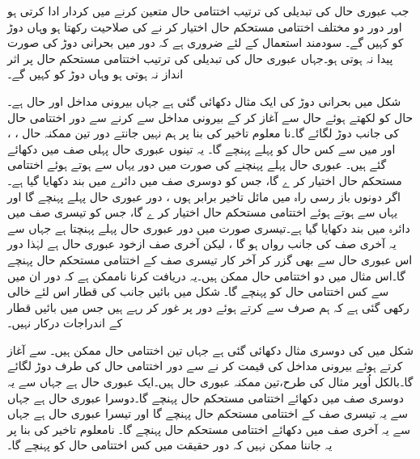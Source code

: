 جب عبوری حال کی تبدیلی کی ترتیب اختتامی حال متعین کرنے میں کردار ادا کرتی ہو اور دور دو مختلف اختتامی مستحکم حال اختیار کر نے کی صلاحیت رکھتا ہو وہاں دوڑ کو  کہیں گے۔ سودمند استعمال کے لئے ضروری ہے کہ دور میں بحرانی دوڑ کی صورت پیدا نہ ہوتی ہو۔جہاں عبوری حال کی تبدیلی کی ترتیب اختتامی مستحکم حال پر اثر انداز نہ ہوتی ہو وہاں دوڑ کو کہیں گے۔



شکل میں بحرانی دوڑ کی ایک مثال دکھائی گئی ہے جہاں بیرونی مداخل  اور حال  ہے۔ حال کو   لکھتے ہوئے حال  سے آغاز کر کے بیرونی مداخل  سے  کرنے سے دور اختتامی حال کی جانب دوڑ لگائے گا۔نا معلوم تاخیر کی بنا پر ہم نہیں جانتے دور تین ممکنہ حال ، ، اور  میں سے کس حال کو پہلے پہنچے گا۔ یہ تینوں عبوری حال پہلی صف میں دکھائے گئے ہیں۔ عبوری حال  پہلے پہنچنے کی صورت میں دور یہاں سے ہوتے ہوئے اختتامی مستحکم حال  اختیار کر ے گا، جس کو دوسری صف میں دائرے میں بند دکھایا گیا ہے۔اگر دونوں باز رسی راہ میں مائل تاخیر برابر ہوں ، دور عبوری حال  پہلے پہنچے گا اور یہاں سے ہوتے ہوئے اختتامی مستحکم حال  اختیار کر ے گا، جس کو تیسری صف میں دائرہ میں بند دکھایا گیا ہے۔تیسری صورت میں دور عبوری حال  پہلے پہنچتا ہے جہاں سے یہ آخری صف کی جانب رواں ہو گا ، لیکن آخری صف ازخود عبوری حال ہے لہٰذا دور اس عبوری حال سے بھی گزر کر آخر کار تیسری صف کے اختتامی مستحکم حال  پہنچے گا۔اس مثال میں دو اختتامی حال ممکن ہیں۔یہ دریافت کرنا ناممکن ہے کہ دور ان میں سے کس اختتامی حال کو پہنچے گا۔ شکل میں بائیں جانب  کی قطار اس لئے خالی رکھی گئی ہے کہ ہم صرف  سے  کرتے ہوئے دور پر غور کر رہے ہیں جس میں بائیں قطار کے اندراجات درکار نہیں۔

شکل میں  کی دوسری مثال دکھائی گئی ہے جہاں تین اختتامی حال ممکن ہیں۔   سے آغاز کرتے ہوئے بیرونی مداخل  کی قیمت  کر نے سے دور اختتامی حال کی طرف دوڑ لگائے گا۔بالکل اُوپر مثال کی طرح،تین ممکنہ عبوری حال ہیں۔ایک عبوری حال  ہے جہاں سے یہ دوسری صف میں دکھائے اختتامی مستحکم حال  پہنچے گا۔دوسرا عبوری حال  ہے جہاں سے یہ تیسری صف کے اختتامی مستحکم حال  پہنچے گا اور تیسرا عبوری حال  ہے جہاں سے یہ آخری صف میں دکھائے اختتامی مستحکم حال  پہنچے گا۔ نامعلوم تاخیر کی بنا پر یہ جاننا ممکن نہیں کہ دور حقیقت میں کس اختتامی حال کو پہنچے گا۔

